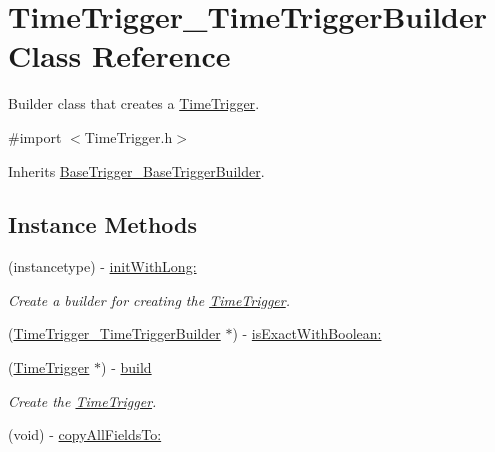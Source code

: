 \hypertarget{interface_time_trigger___time_trigger_builder}{}\section{Time\+Trigger\+\_\+\+Time\+Trigger\+Builder Class Reference}
\label{interface_time_trigger___time_trigger_builder}


Builder class that creates a \hyperlink{interface_time_trigger}{Time\+Trigger}.  




{\ttfamily \#import $<$Time\+Trigger.\+h$>$}



Inherits \hyperlink{interface_base_trigger___base_trigger_builder}{Base\+Trigger\+\_\+\+Base\+Trigger\+Builder}.

\subsection*{Instance Methods}
\begin{DoxyCompactItemize}
\item 
(instancetype) -\/ \hyperlink{interface_time_trigger___time_trigger_builder_a32ceb8e44df02177ea183645ac396f04}{init\+With\+Long\+:}
\begin{DoxyCompactList}\small\item\em Create a builder for creating the \hyperlink{interface_time_trigger}{Time\+Trigger}. \end{DoxyCompactList}\item 
(\hyperlink{interface_time_trigger___time_trigger_builder}{Time\+Trigger\+\_\+\+Time\+Trigger\+Builder} $\ast$) -\/ \hyperlink{interface_time_trigger___time_trigger_builder_ae57bbfa63c4c7b168e5190ab24e0e981}{is\+Exact\+With\+Boolean\+:}
\item 
(\hyperlink{interface_time_trigger}{Time\+Trigger} $\ast$) -\/ \hyperlink{interface_time_trigger___time_trigger_builder_ad2fb0d39e4889a46777e0a4ce8b5bd28}{build}
\begin{DoxyCompactList}\small\item\em Create the \hyperlink{interface_time_trigger}{Time\+Trigger}. \end{DoxyCompactList}\item 
(void) -\/ \hyperlink{interface_time_trigger___time_trigger_builder_aefec76db67f8380460ea1c7e54f0c36d}{copy\+All\+Fields\+To\+:}
\end{DoxyCompactItemize}
